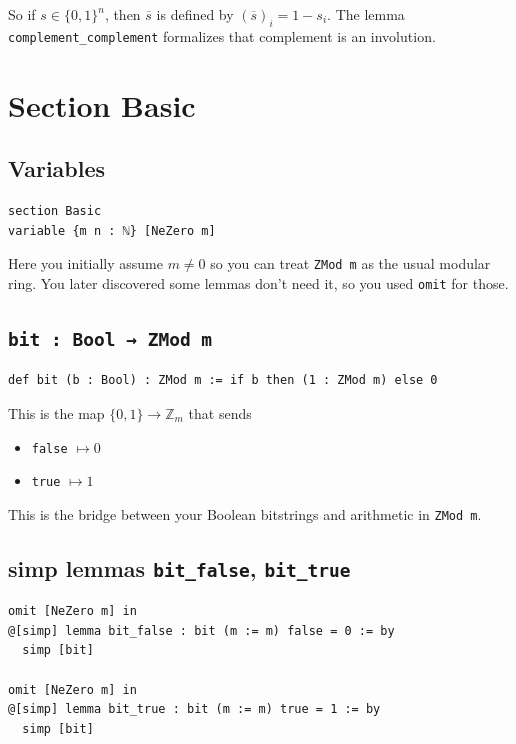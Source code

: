 \documentclass[11pt]{article}
\begin{document}
So if $s\in\{0,1\}^n$, then $\overline{s}$ is defined by $(\overline{s})_i = 1 - s_i$.
The lemma \texttt{complement\_complement} formalizes that complement is an involution.

\section*{Section Basic}

\subsection*{Variables}

\begin{lstlisting}
section Basic
variable {m n : ℕ} [NeZero m]
\end{lstlisting}

Here you initially assume $m\neq 0$ so you can treat \texttt{ZMod m} as the usual modular ring.
You later discovered some lemmas don't need it, so you used \texttt{omit} for those.

\subsection*{\texttt{bit : Bool → ZMod m}}

\begin{lstlisting}
def bit (b : Bool) : ZMod m := if b then (1 : ZMod m) else 0
\end{lstlisting}

This is the map $\{0,1\}\to\mathbb{Z}_m$ that sends
\begin{itemize}
\item \texttt{false} $\mapsto 0$
\item \texttt{true} $\mapsto 1$
\end{itemize}
This is the bridge between your Boolean bitstrings and arithmetic in \texttt{ZMod m}.

\subsection*{simp lemmas \texttt{bit\_false}, \texttt{bit\_true}}

\begin{lstlisting}
omit [NeZero m] in
@[simp] lemma bit_false : bit (m := m) false = 0 := by
  simp [bit]

omit [NeZero m] in
@[simp] lemma bit_true : bit (m := m) true = 1 := by
  simp [bit]
\end{lstlisting}
\end{document}
